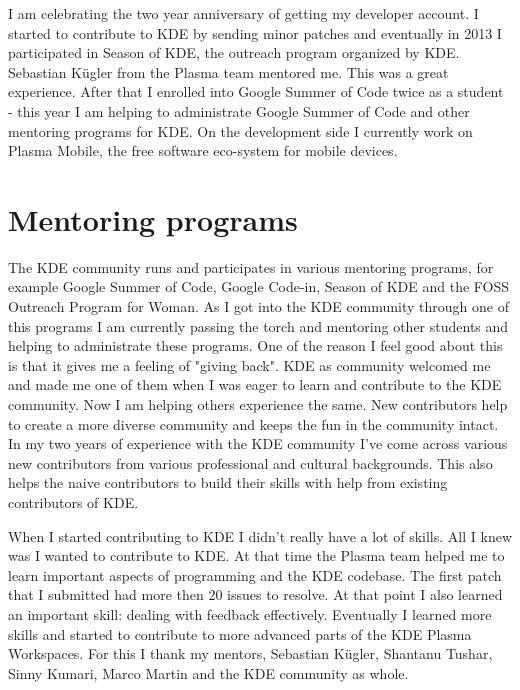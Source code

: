 

\noindent{}I am celebrating the two year anniversary of getting my developer account. I started to contribute to KDE by sending minor patches and eventually in 2013 I participated in Season of KDE, the outreach program organized by KDE. Sebastian K\"{u}gler from the Plasma team mentored me. This was a great experience. After that I enrolled into Google Summer of Code twice as a student - this year I am helping to administrate Google Summer of Code and other mentoring programs for KDE. On the development side I currently work on Plasma Mobile, the free software eco-system for mobile devices.

\section*{Mentoring programs} The KDE community runs and participates in various mentoring programs, for example Google Summer of Code, Google Code-in, Season of KDE and the FOSS Outreach Program for Woman. As I got into the KDE community through one of this programs I am currently passing the torch and mentoring other students and helping to administrate these programs. One of the reason I feel good about this is that it gives me a feeling of "giving back". KDE as community welcomed me and made me one of them when I was eager to learn and contribute to the KDE community. Now I am helping others experience the same. New contributors help to create a more diverse community and keeps the fun in the community intact. In my two years of experience with the KDE community I've come across various new contributors from various professional and cultural backgrounds. This also helps the naive contributors to build their skills with help from existing contributors of KDE.

When I started contributing to KDE I didn't really have a lot of skills. All I knew was I wanted to contribute to KDE. At that time the Plasma team helped me to learn important aspects of programming and the KDE codebase. The first patch that I submitted had more then 20 issues to resolve. At that point I also learned an important skill: dealing with feedback effectively. Eventually I learned more skills and started to contribute to more advanced parts of the KDE Plasma Workspaces. For this I thank my mentors, Sebastian K\"{u}gler, Shantanu Tushar, Sinny Kumari, Marco Martin and the KDE community as whole.

